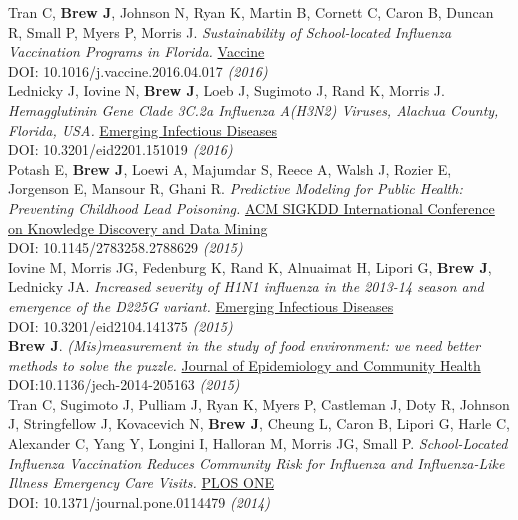 \documentclass[11pt]{article}
\begin{document}
{{\noindent Tran C, \textbf{Brew J}, Johnson N, Ryan K, Martin B, Cornett C, Caron B, Duncan R, Small P, Myers P, Morris J. \emph{Sustainability of School-located Influenza Vaccination Programs in Florida.} \href{http://www.journals.elsevier.com/vaccine}{Vaccine} \\
DOI: 10.1016/j.vaccine.2016.04.017 \hfill \emph{(2016)} \\

\noindent Lednicky J, Iovine N, \textbf{Brew J}, Loeb J, Sugimoto J, Rand K, Morris J. \emph{Hemagglutinin Gene Clade 3C.2a Influenza A(H3N2) Viruses, Alachua County, Florida, USA.} \href{http://wwwnc.cdc.gov/eid/article/22/1/15-1019_article}{Emerging Infectious Diseases} \\
DOI: 10.3201/eid2201.151019 \hfill \emph{(2016)} \\

\noindent Potash E, \textbf{Brew J}, Loewi A, Majumdar S, Reece A, Walsh J, Rozier E, Jorgenson E, Mansour R, Ghani R. \emph{Predictive Modeling for Public Health: Preventing Childhood Lead Poisoning.} \href{http://dl.acm.org/citation.cfm?id=2788629&dl=ACM&coll=DL&CFID=747855435&CFTOKEN=56343631}{ACM SIGKDD International Conference on Knowledge Discovery and Data Mining} \\  
DOI: 10.1145/2783258.2788629 \hfill \emph{(2015)}\\

\noindent Iovine M, Morris JG, Fedenburg K, Rand K, Alnuaimat H, Lipori G, \textbf{Brew J}, Lednicky JA. \emph{Increased severity of H1N1 influenza in the 2013-14 season and emergence of the D225G variant.} \href{http://wwwnc.cdc.gov/eid/article/21/4/14-1375_article}{Emerging Infectious Diseases} \\
DOI: 10.3201/eid2104.141375 \hfill \emph{(2015)}\\


\noindent \textbf{Brew J}. \emph{(Mis)measurement in the study of food environment: we need better methods to solve the puzzle.} \href{http://jech.bmj.com/}{Journal of Epidemiology and Community Health} \\
DOI:10.1136/jech-2014-205163 \hfill \emph{(2015)}\\


\noindent Tran C, Sugimoto J, Pulliam J, Ryan K, Myers P, Castleman J, Doty R, Johnson J, Stringfellow J, Kovacevich N, \textbf{Brew J}, Cheung L, Caron B, Lipori G, Harle C, Alexander C, Yang Y, Longini I, Halloran M, Morris JG, Small P. \emph{School-Located Influenza Vaccination Reduces Community Risk for Influenza and Influenza-Like Illness Emergency Care Visits.} \href{http://journals.plos.org/plosone/article?id=10.1371/journal.pone.0114479}{PLOS ONE} \\
DOI: 10.1371/journal.pone.0114479 \hfill \emph{(2014)}\\



}}
\end{document}
